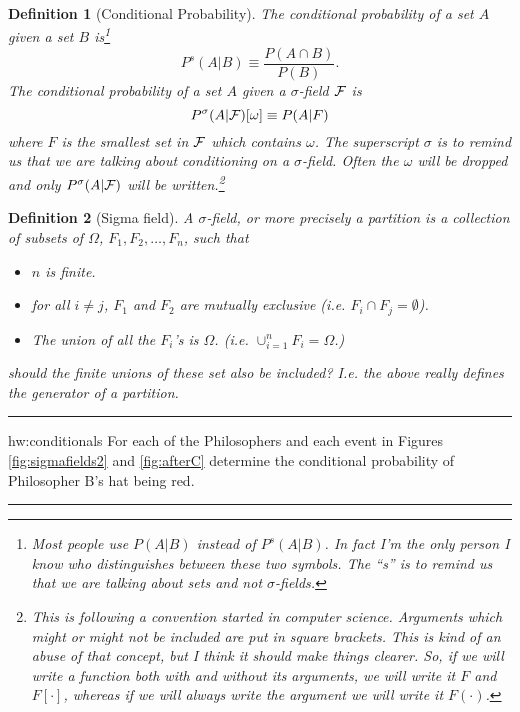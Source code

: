 \documentclass[14pt]{extarticle}
\newtheorem{definition}{Definition}
\newenvironment{textHW}{
  \noindent\rule{\textwidth}{1pt}%
  \begin{list}{}{
      \setlength{\labelwidth}{1cm}
      \setlength{\labelsep}{0.3cm}
      \setlength{\leftmargin}{1.3cm}
      \setlength{\rightmargin}{1cm}
      \setlength{\parsep}{0.5ex plus0.2ex minus0.1ex}
      \setlength{\topsep}{1pt plus3pt minus1pt}
      \setlength{\itemsep}{0ex plus0.2ex} 
      \renewcommand{\makelabel}[1]{\label{thw:##1}{\ref{##1}}}
      \sl}}%
  {\end{list}\rule{\textwidth}{1pt}}
\newcommand{\notes}{}
\begin{document}
\begin{definition}[Conditional Probability]
  \label{def:conditional_prob_easy} The conditional probability of a
  set $A$ given a set $B$ is\footnote{Most people use $P(A|B)$ instead
    of $P^s(A|B)$.  In fact I'm the only person I know who distinguishes
    between these two symbols.  The ``s'' is to remind us that we are
    talking about sets and not $\sigma$-fields.}
\begin{displaymath}
P^s(A|B) \equiv \frac{P(A \cap B)}{P(B)}.
\end{displaymath}
The conditional probability of a set $A$ given a $\sigma$-field
${\cal F}$ is 
\begin{displaymath}
P^\sigma(A|{\cal F})[\omega] \equiv P(A|F)
\end{displaymath}
where $F$ is the smallest set in ${\cal F}$ which contains $\omega$.
The superscript $\sigma$ is to remind us that we are talking about
conditioning on a $\sigma$-field.  Often the $\omega$ will be
dropped and only $P^\sigma(A|{\cal F})$ will be
written.\footnote{This is following a convention started in computer
  science.  Arguments which might or might not be included are put in
  square brackets.  This is kind of an abuse of that concept, but I
  think it should make things clearer.  So, if we will write a
  function both with and without its arguments, we will write it $F$
  and $F[\cdot]$, whereas if we will always write the argument we will
  write it $F(\cdot)$.}
\end{definition}

\begin{definition}[Sigma field] \label{def:partition} A
  $\sigma$-field, or more precisely a partition is a collection of
 subsets of $\Omega$,  $F_1,F_2,\ldots,F_n$, such that 
 \begin{itemize}
 \item $n$ is finite.
 \item for all $i \ne j$, $F_1$ and $F_2$ are mutually exclusive (i.e.
   $F_i \cap F_j = \emptyset$).
 \item The union of all the $F_i$'s is $\Omega$. (i.e. $\cup_{i=1}^n
   F_i = \Omega$.) 
 \end{itemize}
 {\notes should the finite unions of these set also be included?  I.e.
   the above really defines the generator of a partition.}
\end{definition}

\begin{textHW}
\item[hw:conditionals] For each of the Philosophers and each event in
  Figures \ref{fig:sigmafields2} and \ref{fig:afterC} determine the
  conditional probability of Philosopher B's hat being red.
\end{textHW}
\end{document}
